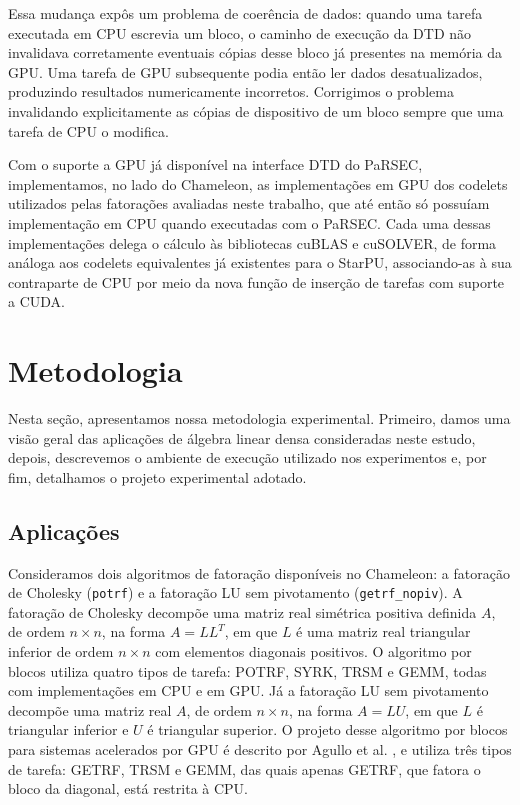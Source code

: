 \documentclass[12pt]{article}
\begin{document}
Essa mudança expôs um problema de coerência de dados: quando uma tarefa
executada em CPU escrevia um bloco, o caminho de execução da DTD não invalidava
corretamente eventuais cópias desse bloco já presentes na memória da GPU. Uma
tarefa de GPU subsequente podia então ler dados desatualizados, produzindo
resultados numericamente incorretos. Corrigimos o problema invalidando
explicitamente as cópias de dispositivo de um bloco sempre que uma tarefa de CPU
o modifica.

Com o suporte a GPU já disponível na interface DTD do PaRSEC, implementamos, no
lado do Chameleon, as implementações em GPU dos codelets utilizados pelas
fatorações avaliadas neste trabalho, que até então só possuíam implementação em
CPU quando executadas com o PaRSEC. Cada uma dessas implementações delega o
cálculo às bibliotecas cuBLAS e cuSOLVER, de forma análoga aos codelets
equivalentes já existentes para o StarPU, associando-as à sua contraparte de CPU
por meio da nova função de inserção de tarefas com suporte a CUDA.
\section{Metodologia}
\label{sec:org9fba521}
Nesta seção, apresentamos nossa metodologia experimental. Primeiro, damos uma
visão geral das aplicações de álgebra linear densa consideradas neste estudo,
depois, descrevemos o ambiente de execução utilizado nos experimentos e, por
fim, detalhamos o projeto experimental adotado.
\subsection{Aplicações}
\label{sec:org75cc0d2}
Consideramos dois algoritmos de fatoração disponíveis no Chameleon: a fatoração
de Cholesky (\texttt{potrf}) e a fatoração LU sem pivotamento (\texttt{getrf\_nopiv}). A
fatoração de Cholesky decompõe uma matriz real simétrica positiva definida \(A\),
de ordem \(n \times n\), na forma \(A = LL^T\), em que \(L\) é uma matriz real
triangular inferior de ordem \(n \times n\) com elementos diagonais positivos. O
algoritmo por blocos utiliza quatro tipos de tarefa: POTRF, SYRK, TRSM e GEMM, todas com implementações em CPU e em GPU. Já a fatoração LU sem pivotamento decompõe uma
matriz real \(A\), de ordem \(n \times n\), na forma \(A = LU\), em que \(L\) é
triangular inferior e \(U\) é triangular superior. O projeto desse algoritmo
por blocos para sistemas acelerados por GPU é descrito por Agullo et al.
\cite{6126599}, e utiliza três tipos de tarefa: GETRF, TRSM e GEMM, das
quais apenas GETRF, que fatora o bloco da diagonal, está restrita à CPU.
\end{document}
